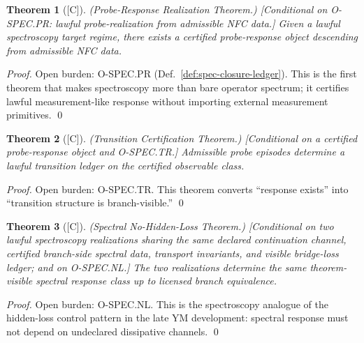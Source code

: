 \documentclass[12pt,oneside]{amsbook}
\theoremstyle{plain}
\newtheorem{theorem}{Theorem}[section]
\theoremstyle{definition}
\theoremstyle{remark}
\newcommand{\status}[1]{\textup{[#1]}}
\begin{document}
\begin{theorem}[\status{C}]\label{thm:spec-probe-realization}
\textup{(Probe-Response Realization Theorem.)}
\textup{[Conditional on O-SPEC.PR: lawful probe-realization from admissible
NFC data.]}
Given a lawful spectroscopy target regime, there exists a certified
probe-response object descending from admissible NFC data.
\end{theorem}

\begin{proof}
Open burden: \textup{O-SPEC.PR} (Def.~\ref{def:spec-closure-ledger}).
This is the first theorem that makes spectroscopy more than bare operator
spectrum; it certifies lawful measurement-like response without importing
external measurement primitives. \qed
\end{proof}

\begin{theorem}[\status{C}]\label{thm:spec-transition-certification}
\textup{(Transition Certification Theorem.)}
\textup{[Conditional on a certified probe-response object and O-SPEC.TR.]}
Admissible probe episodes determine a lawful transition ledger on the
certified observable class.
\end{theorem}

\begin{proof}
Open burden: \textup{O-SPEC.TR}. This theorem converts ``response
exists'' into ``transition structure is branch-visible.'' \qed
\end{proof}

\begin{theorem}[\status{C}]\label{thm:spec-no-hidden-loss}
\textup{(Spectral No-Hidden-Loss Theorem.)}
\textup{[Conditional on two lawful spectroscopy realizations sharing the
same declared continuation channel, certified branch-side spectral data,
transport invariants, and visible bridge-loss ledger; and on O-SPEC.NL.]}
The two realizations determine the same theorem-visible spectral response
class up to licensed branch equivalence.
\end{theorem}

\begin{proof}
Open burden: \textup{O-SPEC.NL}. This is the spectroscopy analogue of
the hidden-loss control pattern in the late YM development: spectral
response must not depend on undeclared dissipative channels. \qed
\end{proof}
\end{document}

